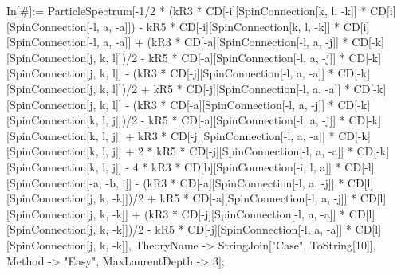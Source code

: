 In[#]:= ParticleSpectrum[-1/2 * (kR3 * CD[-i][SpinConnection[k, l, -k]] * CD[i][SpinConnection[-l, a, -a]]) - kR5 * CD[-i][SpinConnection[k, l, -k]] * CD[i][SpinConnection[-l, a, -a]] + (kR3 * CD[-a][SpinConnection[-l, a, -j]] * CD[-k][SpinConnection[j, k, l]])/2 - kR5 * CD[-a][SpinConnection[-l, a, -j]] * CD[-k][SpinConnection[j, k, l]] - (kR3 * CD[-j][SpinConnection[-l, a, -a]] * CD[-k][SpinConnection[j, k, l]])/2 + kR5 * CD[-j][SpinConnection[-l, a, -a]] * CD[-k][SpinConnection[j, k, l]] - (kR3 * CD[-a][SpinConnection[-l, a, -j]] * CD[-k][SpinConnection[k, l, j]])/2 - kR5 * CD[-a][SpinConnection[-l, a, -j]] * CD[-k][SpinConnection[k, l, j]] + kR3 * CD[-j][SpinConnection[-l, a, -a]] * CD[-k][SpinConnection[k, l, j]] + 2 * kR5 * CD[-j][SpinConnection[-l, a, -a]] * CD[-k][SpinConnection[k, l, j]] - 4 * kR3 * CD[b][SpinConnection[-i, l, a]] * CD[-l][SpinConnection[-a, -b, i]] - (kR3 * CD[-a][SpinConnection[-l, a, -j]] * CD[l][SpinConnection[j, k, -k]])/2 + kR5 * CD[-a][SpinConnection[-l, a, -j]] * CD[l][SpinConnection[j, k, -k]] + (kR3 * CD[-j][SpinConnection[-l, a, -a]] * CD[l][SpinConnection[j, k, -k]])/2 - kR5 * CD[-j][SpinConnection[-l, a, -a]] * CD[l][SpinConnection[j, k, -k]], TheoryName -> StringJoin["Case", ToString[10]], Method -> "Easy", MaxLaurentDepth -> 3]; 